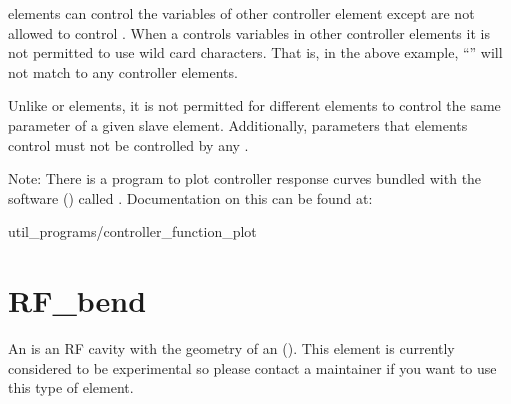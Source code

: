 { elements can control the variables of other controller element except  are
not allowed to control . When a  controls variables in other controller
elements it is not permitted to use wild card characters. That is, in the above example, ``\vn{*}''
will not match to any controller elements.

Unlike  or  elements, it is not permitted for different  elements
to control the same parameter of a given slave element. Additionally, parameters that 
elements control must not be controlled by any .

Note: There is a program to plot controller response curves bundled with the \bmad software
() called . Documentation on this can
be found at:
\begin{example}
  util_programs/controller_function_plot
\end{example}

\newpage

\section{RF_bend}
\label{s:rf.bend}

An  is an RF cavity with the geometry of an  (). This element is
currently considered to be experimental so please contact a \bmad maintainer if you want to use this
type of element.

}
